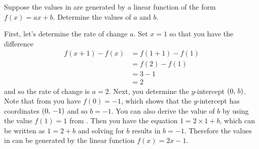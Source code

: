 \documentclass[a4paper,oneside,12pt]{article}
\begin{document}
\begin{table}[!htbp]
\centering

\caption{%
  Some values of a linear function $f(x) = ax + b$.
}
\label{tab:function_values_a_2_b_minus_1}
\end{table}

\begin{example}
Suppose the values in  are
generated by a linear function of the form $f(x) = ax + b$.  Determine
the values of $a$ and $b$.
\end{example}

\begin{solution}
First, let's determine the rate of change $a$.  Set $x = 1$ so that
you have the difference
\begin{align*}
f(x + 1) - f(x)
&=
f(1 + 1) - f(1) \\[4pt]
&=
f(2) - f(1) \\[4pt]
&=
3 - 1 \\[4pt]
&=
2
\end{align*}
and so the rate of change is $a = 2$.  Next, you determine the
$y$-intercept $\left\lparen{0},\, {b}\right\rparen$.  Note that from
 you have
$f(0) = -1$, which shows that the $y$-intercept has coordinates
$\left\lparen{0},\, {-1}\right\rparen$ and so $b = -1$.  You can also derive the value of $b$
by using the value $f(1) = 1$ from
.  Then you have the equation
$1 = 2 \times 1 + b$, which can be written as $1 = 2 + b$ and solving
for $b$ results in $b = -1$.  Therefore the values in
 can be generated by the
linear function $f(x) = 2x - 1$.
\end{solution}

\begin{table}[!htbp]
\centering

\caption{%
  Some values of a linear function $f(x) = ax + b$.
}
\label{tab:function_values_a_3_over_2_b_half}
\end{table}
\end{document}
